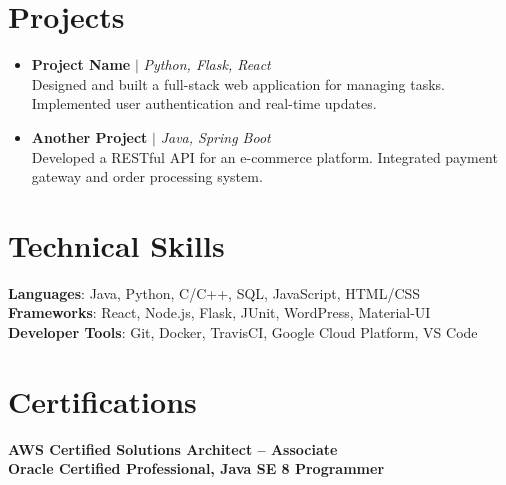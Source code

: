 \documentclass[11pt,a4paper]{article}
\newcommand{\resumeItem}[1]{
  \item\small{
    {#1 \vspace{-2pt}}
  }
}
\begin{document}
\section{Projects}
  \begin{itemize}[leftmargin=0.15in, label={}]
    \resumeItem{\textbf{Project Name} $|$ \emph{Python, Flask, React} \\
    Designed and built a full-stack web application for managing tasks. Implemented user authentication and real-time updates.}
    
    \resumeItem{\textbf{Another Project} $|$ \emph{Java, Spring Boot} \\
    Developed a RESTful API for an e-commerce platform. Integrated payment gateway and order processing system.}
  \end{itemize}


\section{Technical Skills}
 \begin{itemize}[leftmargin=0.15in, label={}]
    \small{\item{
     \textbf{Languages}{: Java, Python, C/C++, SQL, JavaScript, HTML/CSS} \\
     \textbf{Frameworks}{: React, Node.js, Flask, JUnit, WordPress, Material-UI} \\
     \textbf{Developer Tools}{: Git, Docker, TravisCI, Google Cloud Platform, VS Code} \\
    }}
 \end{itemize}


\section{Certifications}
 \begin{itemize}[leftmargin=0.15in, label={}]
    \small{\item{
     \textbf{AWS Certified Solutions Architect – Associate} \\
     \textbf{Oracle Certified Professional, Java SE 8 Programmer}
    }}
 \end{itemize}
\end{document}
